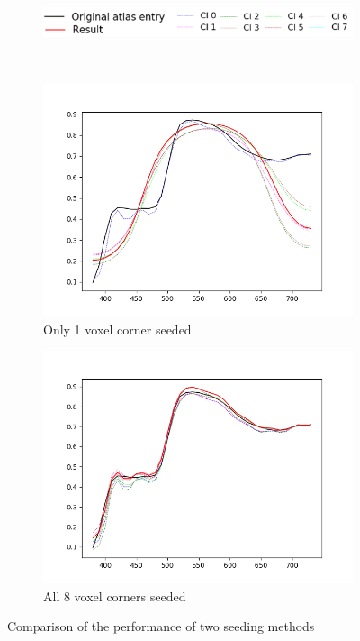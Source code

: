 \begin{figure}[t]
	\centering
	\begin{subfigure}[t]{0.54\textwidth}
		\includegraphics[width=\linewidth]{img/seeding_method_legend.png}
	\end{subfigure} \\
	\begin{subfigure}[t]{0.45\textwidth}
		\includegraphics[width=\linewidth,height=0.2\textheight]{img/seeding_method_1corner.png}
		\caption{Only 1 voxel corner seeded}
		\label{fig:seedingMethod1corner}
	\end{subfigure} \hspace{0.1em}
	\begin{subfigure}[t]{0.45\textwidth}
		\includegraphics[width=\linewidth]{img/seeding_method_8corners.png}
		\caption{All 8 voxel corners seeded}
		\label{fig:seedingMethod8corners}
	\end{subfigure}
	\caption{Comparison of the performance of two seeding methods}
	\label{fig:seedingMethodInterpolation}
\end{figure}

